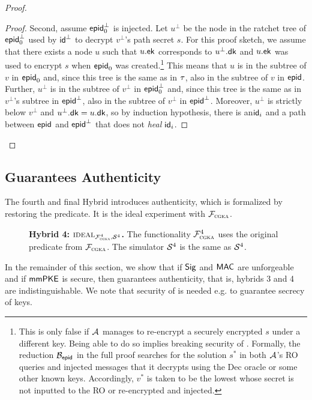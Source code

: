 \begin{proof}
\begin{proof}
  Second, assume $\hgnodeid^\bot_0$ is injected. Let $u^\bot$ be the node in the ratchet tree of $\hgnodeid_0^\bot$ used by $\id^\bot$ to decrypt $v^\bot$'s path secret $s$. For this proof sketch, we assume that there exists a node $u$ such that $u.\mmpkepk$ corresponds to $u^\bot.\mmpkesk$ and $u.\mmpkepk$ was used to encrypt $s$ when $\hgnodeid_0$ was created.\footnote{This
    is only false if $\Adv$ manages to re-encrypt a securely encrypted $s$ under a different key. Being able to do so implies breaking security of \mmPKE. Formally, the reduction $\Bdv[\hgnodeid]$ in the full proof searches for the solution $s^*$ in both $\Adv$'s RO queries and injected messages that it decrypts using the Dec oracle or some other known keys. Accordingly, $v^*$ is taken to be the lowest whose secret is not inputted to the RO or re-encrypted and injected.}
  This means that $u$ is in the subtree of $v$ in $\hgnodeid_0$ and, since this tree is the same as in $\tree$, also in the subtree of $v$ in $\hgnodeid$. Further, $u^\bot$ is in the subtree of $v^\bot$ in $\hgnodeid_0^\bot$ and, since this tree is the same as in $v^\bot$'s subtree in $\hgnodeid^\bot$, also in the subtree of $v^\bot$ in $\hgnodeid^\bot$. Moreover, $u^\bot$ is strictly below $v^\bot$ and $u^\bot.\mmpkesk=u.\mmpkesk$, so by induction hypothesis, there is an$\id_i$ and a path between $\hgnodeid$ and $\hgnodeid^\bot$ that does not \emph{heal} $\id_i$.
\end{proof}
\end{proof}

\newcommand{\forges}{\variable{\small Forges}}
\newcommand{\forgesa}{\variable{\small ForgesAsym}}
\newcommand{\forgess}{\variable{\small ForgesSym}}
\subsection{\saik Guarantees Authenticity}\label{sec:protsec5}
The fourth and final Hybrid introduces authenticity, which is formalized by restoring the \KwAuth{} predicate. It is the ideal experiment with $\funcCGKA$.
\begin{description}
\item[] {\bf Hybrid 4: $\ucideal_{\funcCGKA^4, \ucsim^4}$.} The functionality $\funcCGKA^4$ uses the original \KwAuth{} predicate from $\funcCGKA$. The simulator $\ucsim^4$ is the same as $\ucsim^4$.
\end{description}

In the remainder of this section, we show that if $\sigscheme$ and $\mac$ are unforgeable and if $\mmPKE$ is \mmowrcca secure, then \saik guarantees authenticity, that is, hybrids 3 and 4 are indistinguishable. We note that security of \mmPKE is needed e.g. to guarantee secrecy of \mac keys.

